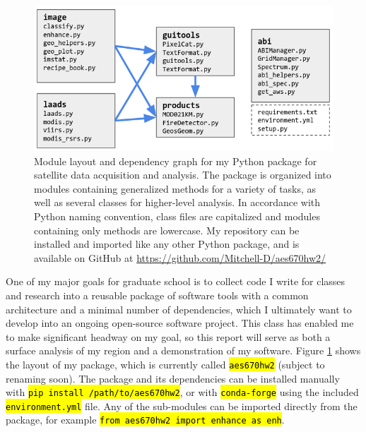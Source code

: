 \documentclass[12pt]{article}
\newcommand{\hltexttt}[1]{\texttt{\hl{#1}}}
\begin{document}
\begin{figure}[h!]
    \centering
    \includegraphics[width=.7\paperwidth]{figs/repo.png}

    \caption{Module layout and dependency graph for my Python package for satellite data acquisition and analysis. The package is organized into modules containing generalized methods for a variety of tasks, as well as several classes for higher-level analysis. In accordance with Python naming convention, class files are capitalized and modules containing only methods are lowercase. My repository can be installed and imported like any other Python package, and is available on GitHub at \url{https://github.com/Mitchell-D/aes670hw2/}}
    \label{repo_diagram}
\end{figure}

One of my major goals for graduate school is to collect code I write for classes and research into a reusable package of software tools with a common architecture and a minimal number of dependencies, which I ultimately want to develop into an ongoing open-source software project. This class has enabled me to make significant headway on my goal, so this report will serve as both a surface analysis of my region and a demonstration of my software. Figure \ref{repo_diagram} shows the layout of my package, which is currently called \hltexttt{aes670hw2} (subject to renaming soon). The package and its dependencies can be installed manually with \hltexttt{pip install /path/to/aes670hw2}, or with \hltexttt{conda-forge} using the included \hltexttt{environment.yml} file. Any of the sub-modules can be imported directly from the package, for example \hltexttt{from aes670hw2 import enhance as enh}.
\end{document}
